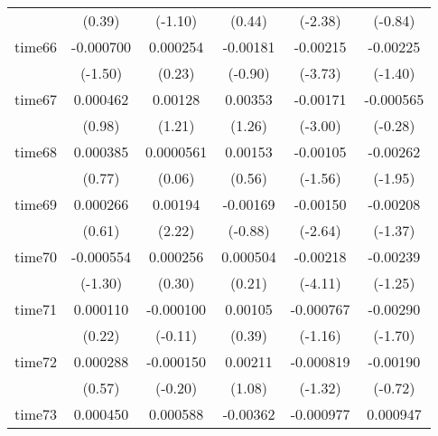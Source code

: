 \begin{table}[htbp]
\begin{tabular}{l*{5}{c}}
            &      (0.39)         &     (-1.10)         &      (0.44)         &     (-2.38)         &     (-0.84)         \\
time66      &   -0.000700         &    0.000254         &    -0.00181         &    -0.00215\sym{***}&    -0.00225         \\
            &     (-1.50)         &      (0.23)         &     (-0.90)         &     (-3.73)         &     (-1.40)         \\
time67      &    0.000462         &     0.00128         &     0.00353         &    -0.00171\sym{**} &   -0.000565         \\
            &      (0.98)         &      (1.21)         &      (1.26)         &     (-3.00)         &     (-0.28)         \\
time68      &    0.000385         &   0.0000561         &     0.00153         &    -0.00105         &    -0.00262         \\
            &      (0.77)         &      (0.06)         &      (0.56)         &     (-1.56)         &     (-1.95)         \\
time69      &    0.000266         &     0.00194\sym{*}  &    -0.00169         &    -0.00150\sym{**} &    -0.00208         \\
            &      (0.61)         &      (2.22)         &     (-0.88)         &     (-2.64)         &     (-1.37)         \\
time70      &   -0.000554         &    0.000256         &    0.000504         &    -0.00218\sym{***}&    -0.00239         \\
            &     (-1.30)         &      (0.30)         &      (0.21)         &     (-4.11)         &     (-1.25)         \\
time71      &    0.000110         &   -0.000100         &     0.00105         &   -0.000767         &    -0.00290         \\
            &      (0.22)         &     (-0.11)         &      (0.39)         &     (-1.16)         &     (-1.70)         \\
time72      &    0.000288         &   -0.000150         &     0.00211         &   -0.000819         &    -0.00190         \\
            &      (0.57)         &     (-0.20)         &      (1.08)         &     (-1.32)         &     (-0.72)         \\
time73      &    0.000450         &    0.000588         &    -0.00362         &   -0.000977         &    0.000947         \\

\end{tabular}
\end{table}

